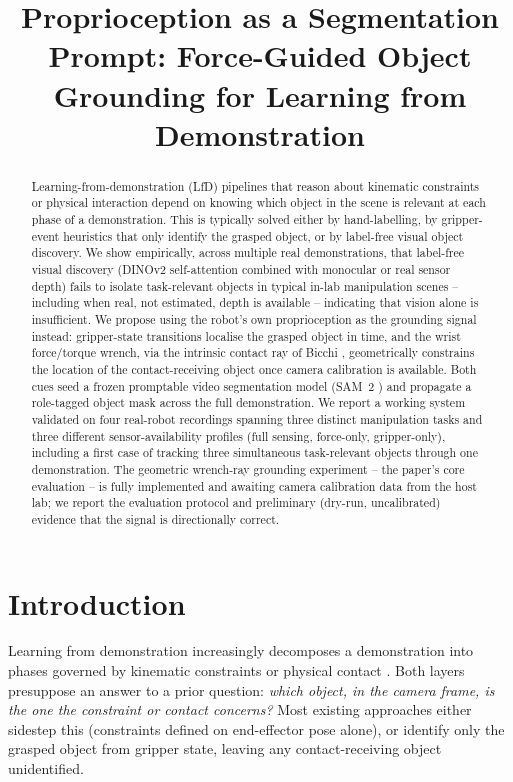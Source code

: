 \documentclass[letterpaper, 10pt, journal, twoside]{IEEEtran}
\title{Proprioception as a Segmentation Prompt: Force-Guided Object Grounding for Learning from Demonstration}
\author{
\IEEEauthorblockN{Anurag Shetye}
\IEEEauthorblockA{University of Twente / NAKAMA Robotics Lab (remote collaboration)}
}
\begin{document}
\maketitle

\begin{abstract}
Learning-from-demonstration (LfD) pipelines that reason about kinematic
constraints or physical interaction depend on knowing which object in the
scene is relevant at each phase of a demonstration. This is typically
solved either by hand-labelling, by gripper-event heuristics that only
identify the grasped object, or by label-free visual object discovery. We
show empirically, across multiple real demonstrations, that label-free
visual discovery (DINOv2 self-attention combined with monocular or real
sensor depth) fails to isolate task-relevant objects in typical in-lab
manipulation scenes -- including when real, not estimated, depth is
available -- indicating that vision alone is insufficient. We propose
using the robot's own proprioception as the grounding signal instead:
gripper-state transitions localise the grasped object in time, and the
wrist force/torque wrench, via the intrinsic contact ray of Bicchi
\cite{bicchi1990}, geometrically constrains the location of the
contact-receiving object once camera calibration is available. Both cues
seed a frozen promptable video segmentation model (SAM~2
\cite{ravi2024sam2}) and propagate a role-tagged object mask across the
full demonstration. We report a working system validated on four
real-robot recordings spanning three distinct manipulation tasks and
three different sensor-availability profiles (full sensing, force-only,
gripper-only), including a first case of tracking three simultaneous
task-relevant objects through one demonstration. The geometric wrench-ray
grounding experiment -- the paper's core evaluation -- is fully
implemented and awaiting camera calibration data from the host lab; we
report the evaluation protocol and preliminary (dry-run, uncalibrated)
evidence that the signal is directionally correct.
\end{abstract}

\section{Introduction}

Learning from demonstration increasingly decomposes a demonstration into
phases governed by kinematic constraints \cite{overbeek2025frontiers} or
physical contact \cite{overbeek2025adrr}. Both layers presuppose an
answer to a prior question: \emph{which object, in the camera frame, is
the one the constraint or contact concerns?} Most existing approaches
either sidestep this (constraints defined on end-effector pose alone), or
identify only the grasped object from gripper state, leaving any
contact-receiving object unidentified.
\end{document}

